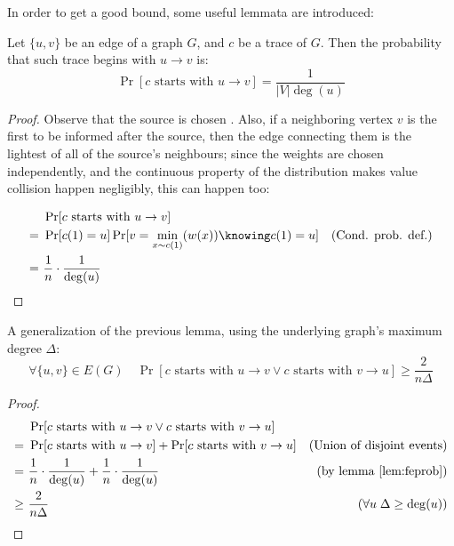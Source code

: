 In order to get a good bound, some useful lemmata are introduced:

\begin{lem}\label{lem:feprob} Let $\{u, v\}$ be an edge of a graph $G$, and $c$ be a trace of $G$. Then the probability that such trace begins with $u \to v$ is:
    \[
        \Pr[c \text{ starts with } u \to v] = \frac{1}{|V| \deg(u)}
    \]
    
\end{lem}

\begin{proof}
    Observe that the source is chosen \uar{}. Also, if a neighboring vertex $v$ is the first to be informed after the source, then the edge connecting them is the lightest of all of the source's neighbours; since the weights are chosen independently, and the continuous property of the distribution makes value collision happen negligibly, this can happen \uar{} too: 

    \begin{align*}
         &\ \Pr[c \text{ starts with } u \to v]                                 & \\
        =&\ \Pr[c(1) = u] \Pr[v = \min_{x \sim c(1)}(w(x)) \knowing c(1) = u]   & \text{(Cond. prob. def.)}\\
        =&\ \frac{1}{n} \cdot \frac{1}{\deg(u)}                                 & \\
    \end{align*}
\end{proof}

\begin{lem}\label{lem:gen-feprob} A generalization of the previous lemma, using the underlying graph's maximum degree $\Delta$:
    \[
        \forall \{u, v\} \in E(G) \quad \Pr[c \text{ starts with } u \to v \vee c \text{ starts with } v \to u] \geq \frac{2}{n \Delta}
    \]
\end{lem}

\begin{proof}
    \begin{align*}
            &\ \Pr[c \text{ starts with } u \to v \vee c \text{ starts with } v \to u]      & \\
           =&\ \Pr[c \text{ starts with } u \to v] + \Pr[c \text{ starts with } v \to u]    & \text{(Union of disjoint events)} \\
           =&\ \frac{1}{n} \cdot \frac{1}{\deg(u)} + \frac{1}{n} \cdot \frac{1}{\deg(u)}    & \text{(by lemma \ref{lem:feprob})}\\
        \geq&\ \frac{2}{n \Delta}                                                           & (\forall u \; \Delta \geq \deg(u)) \\
    \end{align*}
\end{proof}

